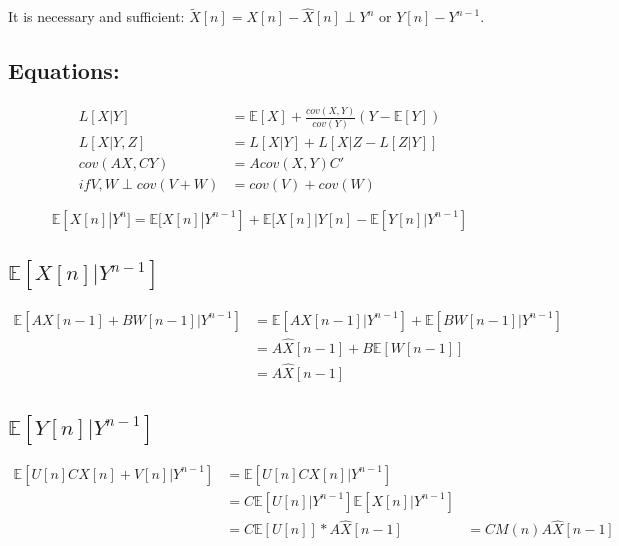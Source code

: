 \documentclass[leqno,twocolumn]{article}
\begin{document}
It is necessary and sufficient: $\tilde{X}[n] = X[n]-\hat{X}[n] \perp Y^n$ or $Y[n] - Y^{n-1}$.

\subsection{Equations:}
\begin{align}
L[X|Y] &= \mathbb{E}[X] + \frac{cov(X,Y)}{cov(Y)}(Y-\mathbb{E}[Y])\\
L[X|Y,Z] &= L[X|Y] + L[X|Z-L[Z|Y]]\\
cov(AX,CY) &= Acov(X,Y)C'\\
if V,W \perp cov(V+W) &= cov(V) + cov(W)
\end{align}

\[ \mathbb{E}[X[n]|Y^n] = \mathbb{E}[X[n]|Y^{n-1}]+\mathbb{E}[X[n]|Y[n]-\mathbb{E}[Y[n]|Y^{n-1}] \]

\setcounter{equation}{0}
\subsection{$\mathbb{E}[X[n]|Y^{n-1}]$}
\begin{align}
\mathbb{E}[AX[n-1] + BW[n-1]|Y^{n-1}] &= \mathbb{E}[AX[n-1]|Y^{n-1}] + \mathbb{E}[BW[n-1]|Y^{n-1}]\\
&= A\hat{X}[n-1] + B\mathbb{E}[W[n-1]]\\
&= A\hat{X}[n-1]
\end{align}

\subsection{$\mathbb{E}[Y[n]|Y^{n-1}]$}
\begin{align}
\mathbb{E}[U[n]CX[n]+V[n]|Y^{n-1}] &= \mathbb{E}[U[n]CX[n]|Y^{n-1}]\\
&= C\mathbb{E}[U[n]|Y^{n-1}]\mathbb{E}[X[n]|Y^{n-1}]\\
&= C\mathbb{E}[U[n]]*A\hat{X}[n-1]
&= CM(n)A\hat{X}[n-1]
\end{align}
\end{document}
